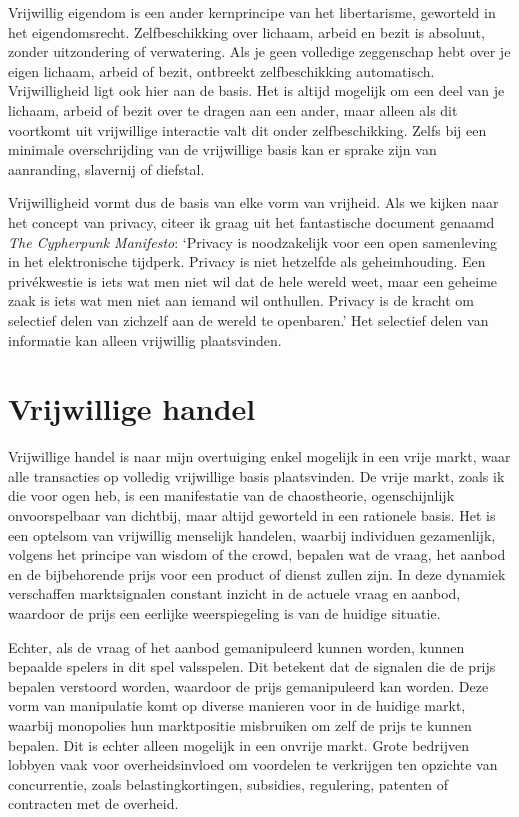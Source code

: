\documentclass[
  a5paper,
  smalldemyvopaper,11pt,twoside,onecolumn,openright,extrafontsizes,
hidelinks]{memoir}
\begin{document}
Vrijwillig eigendom is een ander kernprincipe van het libertarisme,
geworteld in het eigendomsrecht. Zelfbeschikking over lichaam, arbeid en
bezit is absoluut, zonder uitzondering of verwatering. Als je geen
volledige zeggenschap hebt over je eigen lichaam, arbeid of bezit,
ontbreekt zelfbeschikking automatisch. Vrijwilligheid ligt ook hier aan
de basis. Het is altijd mogelijk om een deel van je lichaam, arbeid of
bezit over te dragen aan een ander, maar alleen als dit voortkomt uit
vrijwillige interactie valt dit onder zelfbeschikking. Zelfs bij een
minimale overschrijding van de vrijwillige basis kan er sprake zijn van
aanranding, slavernij of diefstal.

Vrijwilligheid vormt dus de basis van elke vorm van vrijheid. Als we
kijken naar het concept van privacy, citeer ik graag uit het
fantastische document genaamd \emph{The Cypherpunk Manifesto}: `Privacy
is noodzakelijk voor een open samenleving in het elektronische tijdperk.
Privacy is niet hetzelfde als geheimhouding. Een privékwestie is iets
wat men niet wil dat de hele wereld weet, maar een geheime zaak is iets
wat men niet aan iemand wil onthullen. Privacy is de kracht om selectief
delen van zichzelf aan de wereld te openbaren.' Het selectief delen van
informatie kan alleen vrijwillig plaatsvinden.

\section*{Vrijwillige handel}\label{vrijwillige-handel}


Vrijwillige handel is naar mijn overtuiging enkel mogelijk in een vrije
markt, waar alle transacties op volledig vrijwillige basis plaatsvinden.
De vrije markt, zoals ik die voor ogen heb, is een manifestatie van de
chaostheorie, ogenschijnlijk onvoorspelbaar van dichtbij, maar altijd
geworteld in een rationele basis. Het is een optelsom van vrijwillig
menselijk handelen, waarbij individuen gezamenlijk, volgens het principe
van wisdom of the crowd, bepalen wat de vraag, het aanbod en de
bijbehorende prijs voor een product of dienst zullen zijn. In deze
dynamiek verschaffen marktsignalen constant inzicht in de actuele vraag
en aanbod, waardoor de prijs een eerlijke weerspiegeling is van de
huidige situatie.

Echter, als de vraag of het aanbod gemanipuleerd kunnen worden, kunnen
bepaalde spelers in dit spel valsspelen. Dit betekent dat de signalen
die de prijs bepalen verstoord worden, waardoor de prijs gemanipuleerd
kan worden. Deze vorm van manipulatie komt op diverse manieren voor in
de huidige markt, waarbij monopolies hun marktpositie misbruiken om zelf
de prijs te kunnen bepalen. Dit is echter alleen mogelijk in een onvrije
markt. Grote bedrijven lobbyen vaak voor overheidsinvloed om voordelen
te verkrijgen ten opzichte van concurrentie, zoals belastingkortingen,
subsidies, regulering, patenten of contracten met de overheid.
\end{document}
